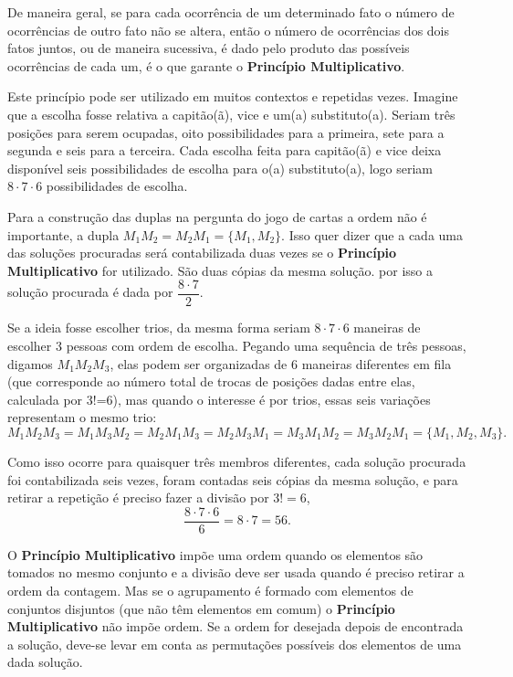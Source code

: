 De maneira geral,  se para cada ocorrência de um determinado fato o número de ocorrências de outro fato não se altera, então o número de ocorrências dos dois fatos juntos, ou de maneira sucessiva,  é dado pelo produto das possíveis ocorrências de cada um, é o que garante o \textbf{Princípio Multiplicativo}. 

Este princípio pode ser utilizado em muitos contextos e repetidas vezes. Imagine que a escolha fosse relativa a capitão(ã), vice e um(a) substituto(a). Seriam três posições para serem ocupadas, oito possibilidades para a primeira, sete para a segunda e seis para a terceira. Cada escolha feita para capitão(ã) e vice deixa disponível seis possibilidades de escolha para o(a) substituto(a), logo seriam $8\cdot 7 \cdot 6$ possibilidades de escolha.

Para a construção das duplas na pergunta do jogo de cartas a ordem não é importante, a dupla $M_1M_2 = M_2M_1 = \{M_1,M_{2}\}$. Isso quer dizer que a cada uma das soluções procuradas será contabilizada duas vezes se o \textbf{Princípio Multiplicativo} for utilizado. São duas cópias da mesma solução. por isso a solução procurada é dada por $\dfrac{8 \cdot 7}{2}$.

 Se a ideia fosse escolher trios, da mesma forma seriam $8\cdot 7 \cdot 6$ maneiras de escolher 3 pessoas com ordem de escolha. Pegando uma sequência de três pessoas, digamos $M_1M_2M_3$, elas podem ser organizadas de 6 maneiras diferentes em fila (que corresponde ao número total de trocas de posições dadas entre elas, calculada por 3!=6), mas quando o interesse é por trios, essas seis variações representam o mesmo trio: $M_1M_2M_3=M_1M_3M_2=M_2M_1M_3=M_2M_3M_1=M_3M_1M_2=M_3M_2M_1=\{M_1,M_{2},M_{3}\}.$
 
 Como isso  ocorre para quaisquer três membros diferentes, cada solução procurada foi contabilizada seis vezes, foram contadas seis cópias da mesma solução, e para retirar a repetição é preciso fazer a divisão por $3!=6$, $$\dfrac{8 \cdot 7 \cdot 6}{6} = 8 \cdot 7 = 56.$$

O \textbf{Princípio Multiplicativo} impõe uma ordem quando os elementos são tomados no mesmo conjunto e a divisão deve ser usada quando é preciso retirar a ordem da contagem. Mas se o agrupamento é formado com elementos de conjuntos disjuntos (que não têm elementos em comum) o \textbf{Princípio Multiplicativo} não impõe ordem. Se a ordem for desejada depois de encontrada a solução, deve-se levar em conta as permutações possíveis dos elementos de uma dada solução. 


